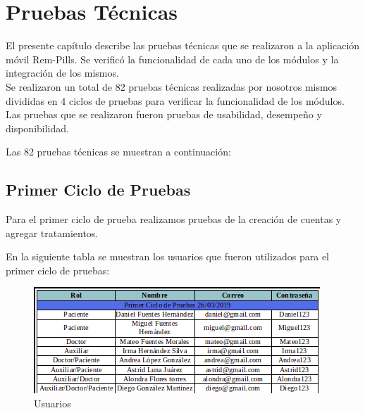 \newpage
\section{Pruebas Técnicas}

El presente capítulo describe las pruebas técnicas que se realizaron a la aplicación móvil Rem-Pills. Se verificó la funcionalidad de cada uno de los módulos y la integración de los mismos.\\

Se realizaron un total de 82 pruebas técnicas realizadas por nosotros mismos divididas en 4 ciclos de pruebas para verificar la funcionalidad de los módulos.\\

Las pruebas que se realizaron fueron pruebas de usabilidad, desempeño y disponibilidad.

Las 82 pruebas técnicas se muestran a continuación:

\subsection{Primer Ciclo de Pruebas}

Para el primer ciclo de prueba realizamos pruebas de la creación de cuentas y agregar tratamientos.

En la siguiente tabla se muestran los usuarios que fueron utilizados para el primer ciclo de pruebas:

\begin{figure}[!htbp]			
	\hypertarget{fig:Usuarios}{\hspace{1pt}}
	\begin{center}
		\includegraphics[height=0.3\textheight]{Pruebas/images/Usuarios1}
		\caption{Usuarios}
		\label{fig:Usuarios}
	\end{center}
\end{figure}


